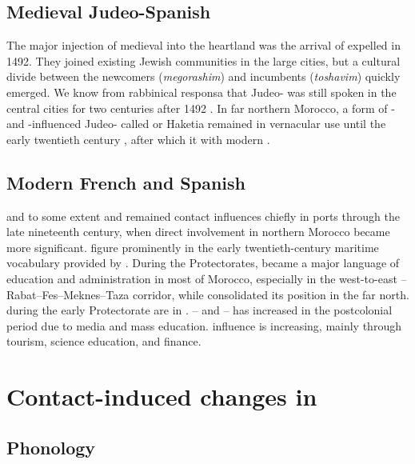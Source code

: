 \documentclass[output=paper]{langsci/langscibook}
\begin{document}
\subsection{Medieval Judeo-Spanish}

The major injection of medieval  into the  heartland was the arrival of expelled   in 1492. They joined existing Jewish communities in the large cities, but a cultural divide between the newcomers (\textit{megorashim}) and incumbents (\textit{toshavim}) quickly emerged. We know from rabbinical responsa that Judeo- was still spoken in the central cities for two centuries after 1492 \citep{Chetrit1985}. In far northern Morocco, a form of - and -influenced Judeo- called  or Haketia remained in vernacular use until the early twentieth century \citep{Benoliel1977}, after which it  with modern .

\subsection{Modern French and Spanish}

 and to some extent  and  remained contact influences chiefly in ports through the late nineteenth century, when direct  involvement in northern Morocco became more significant.   figure prominently in the early twentieth-century maritime vocabulary provided by \citet{Brunot1920}. During the Protectorates,  became a major language of education and administration in most of Morocco, especially in the west-to-east –Rabat–Fes–Meknes–Taza corridor, while  consolidated its position in the far north.   during the early Protectorate are in \citet{Brunot1949}. – and –  has increased in the postcolonial period due to media and mass education.  influence is increasing, mainly through tourism, science education, and finance.

\section{Contact-induced changes in }

\subsection{Phonology}
\end{document}
